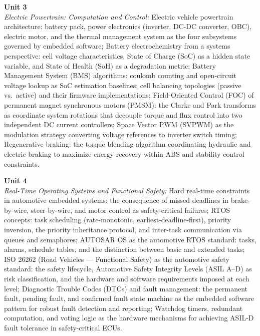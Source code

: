 \vspace{0.3cm}

\noindent\textbf{Unit 3} \\
\textit{Electric Powertrain: Computation and Control:} Electric vehicle powertrain architecture: battery pack, power electronics (inverter, DC-DC converter, OBC), electric motor, and the thermal management system as the four subsystems governed by embedded software; Battery electrochemistry from a systems perspective: cell voltage characteristics, State of Charge (SoC) as a hidden state variable, and State of Health (SoH) as a degradation metric; Battery Management System (BMS) algorithms: coulomb counting and open-circuit voltage lookup as SoC estimation baselines; cell balancing topologies (passive vs.\ active) and their firmware implementations; Field-Oriented Control (FOC) of permanent magnet synchronous motors (PMSM): the Clarke and Park transforms as coordinate system rotations that decouple torque and flux control into two independent DC current controllers; Space Vector PWM (SVPWM) as the modulation strategy converting voltage references to inverter switch timing; Regenerative braking: the torque blending algorithm coordinating hydraulic and electric braking to maximize energy recovery within ABS and stability control constraints.

\vspace{0.3cm}

\noindent\textbf{Unit 4} \\
\textit{Real-Time Operating Systems and Functional Safety:} Hard real-time constraints in automotive embedded systems: the consequence of missed deadlines in brake-by-wire, steer-by-wire, and motor control as safety-critical failures; RTOS concepts: task scheduling (rate-monotonic, earliest-deadline-first), priority inversion, the priority inheritance protocol, and inter-task communication via queues and semaphores; AUTOSAR OS as the automotive RTOS standard: tasks, alarms, schedule tables, and the distinction between basic and extended tasks; ISO 26262 (Road Vehicles — Functional Safety) as the automotive safety standard: the safety lifecycle, Automotive Safety Integrity Levels (ASIL A–D) as risk classification, and the hardware and software requirements imposed at each level; Diagnostic Trouble Codes (DTCs) and fault management: the permanent fault, pending fault, and confirmed fault state machine as the embedded software pattern for robust fault detection and reporting; Watchdog timers, redundant computation, and voting logic as the hardware mechanisms for achieving ASIL-D fault tolerance in safety-critical ECUs.

